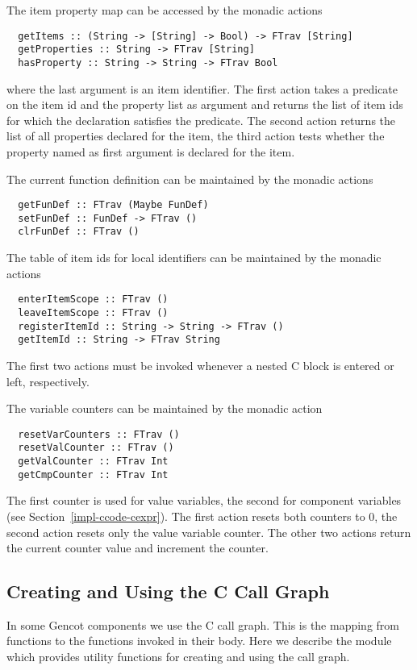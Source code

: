 The item property map can be accessed by the monadic actions
\begin{verbatim}
  getItems :: (String -> [String] -> Bool) -> FTrav [String]
  getProperties :: String -> FTrav [String]
  hasProperty :: String -> String -> FTrav Bool
\end{verbatim}
where the last  argument is an item identifier.  The first action takes a predicate 
on the item id and the property list as argument and returns the list of item ids for which the declaration satisfies
the predicate. 
The second action returns the list of all properties declared 
for the item, the third action tests whether the property named as first argument is declared for the item.

The current function definition can be maintained by the monadic actions
\begin{verbatim}
  getFunDef :: FTrav (Maybe FunDef)
  setFunDef :: FunDef -> FTrav ()
  clrFunDef :: FTrav ()
\end{verbatim}

The table of item ids for local identifiers can be maintained by the monadic actions
\begin{verbatim}
  enterItemScope :: FTrav ()
  leaveItemScope :: FTrav ()
  registerItemId :: String -> String -> FTrav ()
  getItemId :: String -> FTrav String
\end{verbatim}
The first two actions must be invoked whenever a nested C block is entered or left, respectively.

The variable counters can be maintained by the monadic action
\begin{verbatim}
  resetVarCounters :: FTrav ()
  resetValCounter :: FTrav ()
  getValCounter :: FTrav Int
  getCmpCounter :: FTrav Int
\end{verbatim}
The first counter is used for value variables, the second for component variables (see Section~\ref{impl-ccode-cexpr}).
The first action resets both counters to 0, the second action resets only the value variable counter. 
The other two actions return the current counter value and increment the counter.

\subsection{Creating and Using the C Call Graph}
\label{impl-ccode-callgraph}

In some Gencot components we use the C call graph. This is the mapping from functions to the functions
invoked in their body. Here we describe the module  which provides
utility functions for creating and using the call graph.

